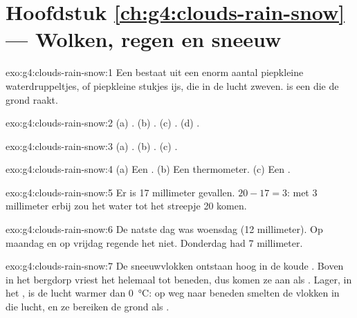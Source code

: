 \section*{Hoofdstuk \ref{ch:g4:clouds-rain-snow} --- Wolken, regen en sneeuw}

\begin{solution}{exo:g4:clouds-rain-snow:1}
Een  bestaat uit een enorm aantal piepkleine waterdruppeltjes, of
piepkleine stukjes ijs, die in de lucht zweven.  is een  die de
grond raakt.
\end{solution}

\begin{solution}{exo:g4:clouds-rain-snow:2}
(a) . (b) . (c) . (d) .
\end{solution}

\begin{solution}{exo:g4:clouds-rain-snow:3}
(a) . (b) . (c) .
\end{solution}

\begin{solution}{exo:g4:clouds-rain-snow:4}
(a) Een . (b) Een thermometer. (c) Een .
\end{solution}

\begin{solution}{exo:g4:clouds-rain-snow:5}
Er is 17 millimeter  gevallen. $20 - 17 = 3$: met 3 millimeter erbij
zou het water tot het streepje 20 komen.
\end{solution}

\begin{solution}{exo:g4:clouds-rain-snow:6}
De natste dag was woensdag (12 millimeter). Op maandag en op vrijdag
regende het niet. Donderdag had 7 millimeter.
\end{solution}

\begin{solution}{exo:g4:clouds-rain-snow:7}
De sneeuwvlokken ontstaan hoog in de koude . Boven in het bergdorp
vriest het helemaal tot beneden, dus komen ze aan als . Lager, in het
, is de lucht warmer dan \SI{0}{\celsius}: op weg naar beneden smelten de
vlokken in die lucht, en ze bereiken de grond als .
\end{solution}


